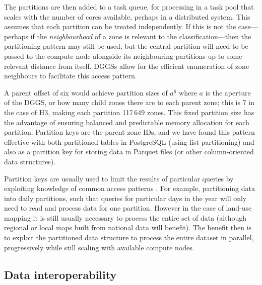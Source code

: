 \documentclass[]{interact}
\theoremstyle{plain}%
\theoremstyle{definition}
\theoremstyle{remark}
\begin{document}
The partitions are then added to a task queue, for processing in a task pool that scales with the number of cores available, perhaps in a distributed system. This assumes that each partition can be treated independently. If this is not the case---perhaps if the \textit{neighbourhood} of a zone is relevant to the classification---then the partitioning pattern may still be used, but the central partition will need to be passed to the compute node alongside its neighbouring partitions up to some relevant distance from itself. \acp{DGGS} allow for the efficient enumeration of zone neighbours to facilitate this access pattern.

A parent offset of six would achieve partition sizes of $a^{6}$ where $a$ is the aperture of the \ac{DGGS}, or how many child zones there are to each parent zone; this is 7 in the case of H3, making each partition 117\,649 zones. This fixed partition size has the advantage of ensuring balanced and predictable memory allocation for each partition. Partition keys are the parent zone IDs, and we have found this pattern effective with both partitioned tables in PostgreSQL (using list partitioning) and also as a partition key for storing data in Parquet files (or other column-oriented data structures).

Partition keys are usually used to limit the results of particular queries by exploiting knowledge of common access patterns \citep{abadi2008column}. For example, partitioning data into daily partitions, such that queries for particular days in the year will only need to read and process data for one partition. However in the case of land-use mapping it is still usually necessary to process the entire set of data (although regional or local maps built from national data will benefit). The benefit then is to exploit the partitioned data structure to process the entire dataset in parallel, progressively while still scaling with available compute nodes.

\subsection{Data interoperability}
\end{document}
